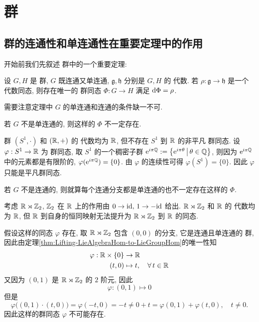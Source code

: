 \chapter{\Lie 群}
    \section{\Lie 群的连通性和单连通性在重要定理中的作用}
        开始前我们先叙述 \Lie 群中的一个重要定理:
        \begin{theorem}\label{thm:Lifting-LieAlgebraHom-to-LieGroupHom}
            设 $G,H$ 是 \Lie 群, $G$ 既连通又单连通, $\mathfrak{g},\mathfrak{h}$ 分别是 $G,H$ 的 \Lie 代数.
            若 $\rho:\mathfrak{g}\rightarrow\mathfrak{h}$ 是一个 \Lie 代数同态, 则存在唯一的 \Lie 群同态 $\Phi:G\rightarrow H$ 
            满足 ${\rm d}\Phi = \rho$.
        \end{theorem}
        需要注意定理中 $G$ 的单连通和连通的条件缺一不可.
        \begin{example}
            若 $G$ 不是单连通的, 则这样的 $\Phi$ 不一定存在.

            \Lie 群 $(S^1,\cdot)$ 和 $(\mathbb{R},+)$ 的 \Lie 代数均为 $\mathbb{R}$, 但不存在 $S^1$ 到 $\mathbb{R}$ 的非平凡 \Lie 群同态. 
            设 $\varphi:S^1\rightarrow\mathbb{R}$ 为 \Lie 群同态, 取 $S^1$ 的一个稠密子群 ${\rm e}^{i\pi\mathbb{Q}}:=\left\{{\rm e}^{i\pi\theta}\,\big|\,\theta\in\mathbb{Q}\right\}$, 
            则因为 ${\rm e}^{i\pi\mathbb{Q}}$ 中的元素都是有限阶的, $\varphi({\rm e}^{i\pi\mathbb{Q}}) = \{0\}$. 由 $\varphi$ 的连续性可得 $\varphi(S^1) = \{0\}$. 因此 $\varphi$ 只能是平凡群同态.
        \end{example}
        \begin{example}
            若 $G$ 不是连通的, 则就算每个连通分支都是单连通的也不一定存在这样的 $\Phi$.

            考虑 $\mathbb{R}\rtimes\mathbb{Z}_2$, $\mathbb{Z}_2$ 在 $\mathbb{R}$ 上的作用由 $0\rightarrow{\rm id},\,1\rightarrow-{\rm id}$ 给出. $\mathbb{R}\rtimes\mathbb{Z}_2$ 和 $\mathbb{R}$ 的 \Lie 代数均为 $\mathbb{R}$, 
            但 $\mathbb{R}$ 到自身的恒同映射无法提升为 $\mathbb{R}\rtimes\mathbb{Z}_2$ 到 $\mathbb{R}$ 的同态.

            假设这样的同态 $\varphi$ 存在, 取 $\mathbb{R}\rtimes\mathbb{Z}_2$ 包含 $(0,0)$ 的分支, 它是连通且单连通的 \Lie 群, 因此由定理{\rm\ref{thm:Lifting-LieAlgebraHom-to-LieGroupHom}}的唯一性知
            \begin{align*}
                \varphi:\mathbb{R}\times\{0\}&\rightarrow\mathbb{R} \\
                (t,0)&\mapsto t,\quad\forall\,t\in\mathbb{R}
            \end{align*}
            又因为 $(0,1)$ 是 $\mathbb{R}\rtimes\mathbb{Z}_2$ 的 $2$ 阶元, 因此 
            \begin{equation*}
                \varphi:(0,1)\mapsto 0
            \end{equation*}
            但是
            \begin{equation*}
                \varphi\Big((0,1)\cdot(t,0)\Big) = \varphi(-t,0) = -t \neq 0+t = \varphi(0,1)+\varphi(t,0),\quad t\neq0.
            \end{equation*}
            因此这样的群同态 $\varphi$ 不可能存在.
        \end{example}